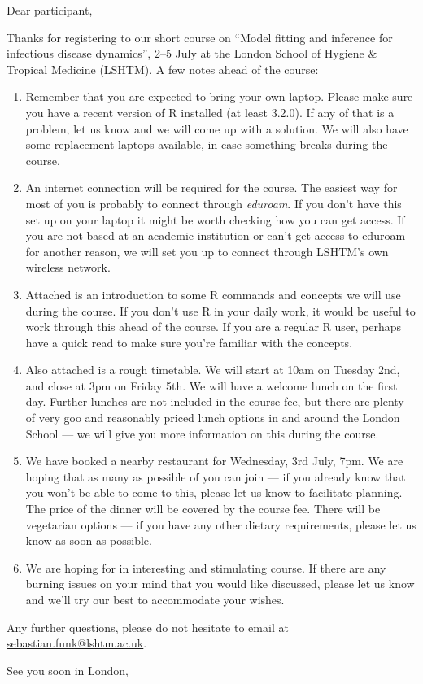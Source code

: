 \documentclass[paper=a4, 11pt]{scrlttr2}
\begin{document}
\begin{letter}{}
\opening{Dear participant,}
Thanks for registering to our short course on ``Model fitting and
inference for infectious disease dynamics'', 2--5 July at the London
School of Hygiene \& Tropical Medicine (LSHTM). A few notes ahead of
the course:

\begin{enumerate}
\item Remember that you are expected to bring your own laptop. Please make sure
  you have a recent version of R installed
(at least 3.2.0). If any of that is a problem, let us know 
and we will come up with a solution. We will also have some replacement laptops
available, in case something breaks during the course.
\item An internet connection will be required for the course. The easiest
way for most of you is probably to connect through \emph{eduroam}. If you
don't have this set up on your laptop it might be worth checking how you
can get access. If you are not based at an academic institution or can't
get access to eduroam for another reason, we will set you up to connect
through LSHTM's own wireless network.
\item Attached is an introduction to some R commands and concepts
we will use during the course. If you don't use R in your daily work, it
would be useful to work through this ahead of the course. If you are a
regular R user, perhaps have a quick read to 
make sure you're familiar with the concepts.
\item Also attached is a rough timetable. We will start at 10am on Tuesday 2nd, and close at 3pm on Friday 5th. We will have a welcome lunch on the first day. Further lunches are not included in the course fee, but there are plenty of very goo and reasonably priced lunch options in and around the London School --- we will give you more information on this during the course.
\item We have booked a nearby restaurant for Wednesday, 3rd July, 7pm. We are hoping that as many as possible of you
can join --- if you already know that you won't be able to come to this,
please let us know to facilitate planning. The price of the dinner will
be covered by the course fee. There will be vegetarian options --- if you
have any other dietary requirements, please let us know as soon as
possible.
\item We are hoping for in interesting and stimulating course. If there are
any burning issues on your mind that you would like discussed, please
let us know and we'll try our best to accommodate your wishes.
\end{enumerate}
Any further questions, please do not hesitate to email at \href{mailto:sebastian.funk@lshtm.ac.uk}{sebastian.funk@lshtm.ac.uk}.

\closing{See you soon in London,}
\end{letter}
\end{document}
